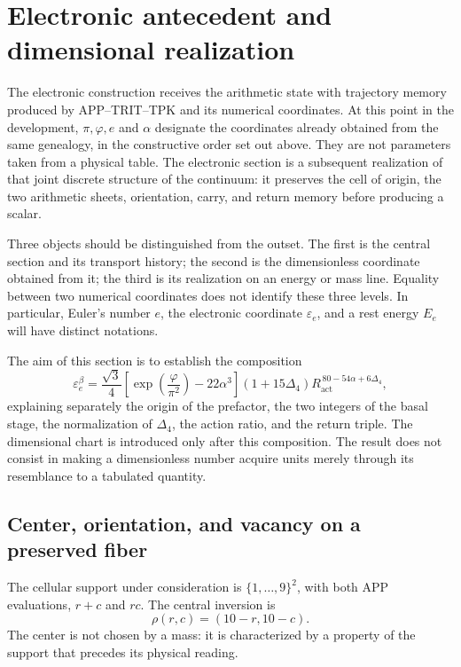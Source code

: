 \section{Electronic antecedent and dimensional realization}
\label{sec:electron}

The electronic construction receives the arithmetic state with
trajectory memory produced by APP--TRIT--TPK and its numerical coordinates. At this point in the development,
\(\pi,\varphi,e\) and \(\alpha\) designate the coordinates already obtained from
the same genealogy, in the constructive order set out above. They
are not parameters taken from a physical table. The electronic section is a
subsequent realization of that joint discrete structure of the continuum:
it preserves the cell of origin, the two arithmetic sheets, orientation,
carry, and return memory before producing a scalar.

Three objects should be distinguished from the outset. The first is the central
section and its transport history; the second is the dimensionless
coordinate obtained from it; the third is its realization on an
energy or mass line. Equality between two numerical coordinates does not
identify these three levels. In particular, Euler's number \(e\),
the electronic coordinate \(\varepsilon_e\), and a rest energy
\(E_e\) will have distinct notations.

The aim of this section is to establish the composition
\begin{equation}
 \varepsilon_e^{\beta}
 =\frac{\sqrt3}{4}
  \left[\exp\!\left(\frac{\varphi}{\pi^2}\right)-22\alpha^3\right]
  (1+15\Delta_4)
  R_{\mathrm{act}}^{\,80-54\alpha+6\Delta_4},
 \label{eq:el-formula-completa}
\end{equation}
explaining separately the origin of the prefactor, the two integers of the
basal stage, the normalization of \(\Delta_4\), the action ratio, and the
return triple. The dimensional chart is introduced only after
this composition. The result does not consist in making a
dimensionless number acquire units merely through its resemblance to a tabulated
quantity.



\subsection{Center, orientation, and vacancy on a preserved fiber}

The cellular support under consideration is \(\{1,\ldots,9\}^2\), with both
APP evaluations, \(r+c\) and \(rc\). The central inversion is
\begin{equation}
 \rho(r,c)=(10-r,10-c).
 \label{eq:el-inversion-central}
\end{equation}
The center is not chosen by a mass: it is characterized by a property of
the support that precedes its physical reading.

